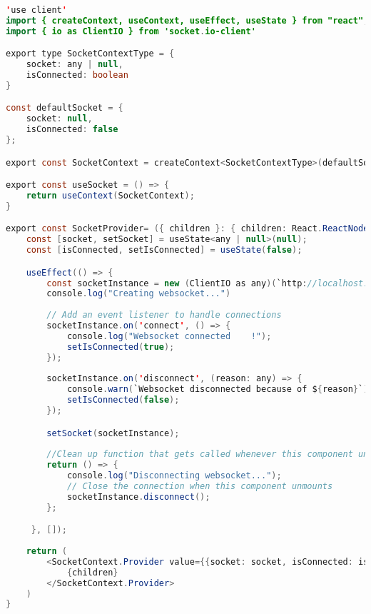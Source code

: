 \begin{lstlisting}[language=Java, caption={Socket Provider Component}, label={lst:java}]
'use client'
import { createContext, useContext, useEffect, useState } from "react";
import { io as ClientIO } from 'socket.io-client'

export type SocketContextType = {
    socket: any | null,
    isConnected: boolean
}

const defaultSocket = {
    socket: null,
    isConnected: false
};

export const SocketContext = createContext<SocketContextType>(defaultSocket);

export const useSocket = () => {
    return useContext(SocketContext);
}

export const SocketProvider= ({ children }: { children: React.ReactNode }) => {
    const [socket, setSocket] = useState<any | null>(null);
    const [isConnected, setIsConnected] = useState(false);

    useEffect(() => {
        const socketInstance = new (ClientIO as any)(`http://localhost:5050`);
        console.log("Creating websocket...")
        
        // Add an event listener to handle connections
        socketInstance.on('connect', () => {
            console.log("Websocket connected    !");
            setIsConnected(true);
        });
        
        socketInstance.on('disconnect', (reason: any) => {
            console.warn(`Websocket disconnected because of ${reason}`);
            setIsConnected(false);
        });

        setSocket(socketInstance);
        
        //Clean up function that gets called whenever this component unmounts
        return () => {
            console.log("Disconnecting websocket...");
            // Close the connection when this component unmounts
            socketInstance.disconnect();
        };

     }, []);
     
    return (
        <SocketContext.Provider value={{socket: socket, isConnected: isConnected}}>
            {children}
        </SocketContext.Provider>
    )
}
\end{lstlisting}
